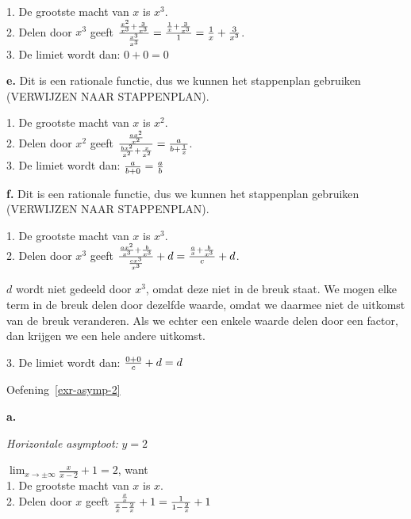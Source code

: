 \documentclass[
  a4paper,
]{scrbook}
\theoremstyle{definition}
\theoremstyle{remark}
\begin{document}
1. De grootste macht van \(x\) is \(x^3\).\\
2. Delen door \(x^3\) geeft
\({{x^2\over x^3}+{3\over x^3} \over {x^3 \over x^3}} = {{1\over x}+{3\over x^3} \over 1} = {1\over x}+{3\over x^3}\).\\
3. De limiet wordt dan: \(0+0 = 0\)

\textbf{e.} Dit is een rationale functie, dus we kunnen het stappenplan
gebruiken (VERWIJZEN NAAR STAPPENPLAN).

1. De grootste macht van \(x\) is \(x^2\).\\
2. Delen door \(x^2\) geeft
\({{ax^2 \over x^2} \over {bx^2 \over x^2} + {x \over x^2}} = {a \over b + {1 \over x}}\).\\
3. De limiet wordt dan: \({a \over b + 0} = {a \over b}\)

\textbf{f.} Dit is een rationale functie, dus we kunnen het stappenplan
gebruiken (VERWIJZEN NAAR STAPPENPLAN).

1. De grootste macht van \(x\) is \(x^3\).\\
2. Delen door \(x^3\) geeft
\({{ax^2 \over x^3}+{b \over x^3} \over {cx^3 \over x^3}}+d = {{a \over x}+{b \over x^3} \over c}+d\).

\begin{tcolorbox}[enhanced jigsaw, coltitle=black, breakable, bottomtitle=1mm, opacityback=0, colback=white, rightrule=.15mm, title=\textcolor{quarto-callout-caution-color}{\faFire}\hspace{0.5em}{Opgelet}, bottomrule=.15mm, toprule=.15mm, left=2mm, colframe=quarto-callout-caution-color-frame, toptitle=1mm, opacitybacktitle=0.6, titlerule=0mm, colbacktitle=quarto-callout-caution-color!10!white, leftrule=.75mm, arc=.35mm]

\(d\) wordt niet gedeeld door \(x^3\), omdat deze niet in de breuk
staat. \textbar{} We mogen elke term in de breuk delen door dezelfde
waarde, omdat we daarmee niet de uitkomst van de breuk veranderen. Als
we echter een enkele waarde delen door een factor, dan krijgen we een
hele andere uitkomst.

\end{tcolorbox}

3. De limiet wordt dan: \({0+0 \over c}+d = d\)

Oefening~\ref{exr-asymp-2}

\textbf{a.}

\emph{Horizontale asymptoot:} \(y=2\)

\(\lim_{x\to\pm\infty} \frac{x}{x-2}+1=2\), want\\
1. De grootste macht van \(x\) is \(x\).\\
2. Delen door \(x\) geeft
\({{x \over x} \over {x \over x}-{2 \over x}} + 1 = {1 \over 1-{2 \over x}} + 1\)
\end{document}
